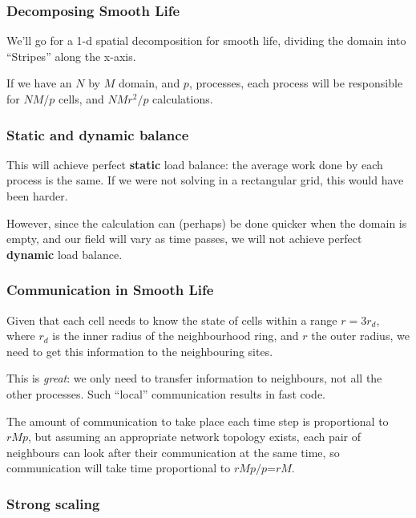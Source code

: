 \subsubsection{Decomposing Smooth Life}\label{decomposing-smooth-life}

We'll go for a 1-d spatial decomposition for smooth life, dividing the
domain into ``Stripes'' along the x-axis.

If we have an $N$ by $M$ domain, and $p$, processes, each process will
be responsible for $NM/p$ cells, and $NMr^2/p$ calculations.

\subsubsection{Static and dynamic
balance}\label{static-and-dynamic-balance}

This will achieve perfect \textbf{static} load balance: the average work
done by each process is the same. If we were not solving in a
rectangular grid, this would have been harder.

However, since the calculation can (perhaps) be done quicker when the
domain is empty, and our field will vary as time passes, we will not
achieve perfect \textbf{dynamic} load balance.

\subsubsection{Communication in Smooth
Life}\label{communication-in-smooth-life}

Given that each cell needs to know the state of cells within a range
$r=3r_d$, where $r_d$ is the inner radius of the neighbourhood ring, and
$r$ the outer radius, we need to get this information to the
neighbouring sites.

This is \emph{great}: we only need to transfer information to
neighbours, not all the other processes. Such ``local'' communication
results in fast code.

The amount of communication to take place each time step is proportional
to $rMp$, but assuming an appropriate network topology exists, each pair
of neighbours can look after their communication at the same time, so
communication will take time proportional to $rMp/p$=$rM$.

\subsubsection{Strong scaling}\label{strong-scaling}

